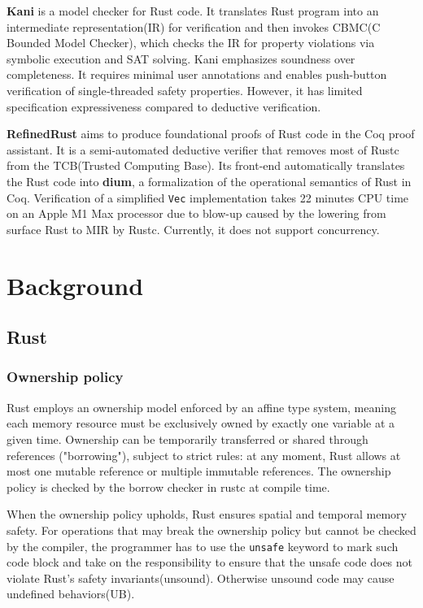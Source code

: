 \documentclass[conference]{IEEEtran}
\begin{document}
\textbf{Kani}\cite{kani} is a model checker for Rust code. It translates Rust program into an intermediate representation(IR) for verification and then invokes CBMC(C Bounded Model Checker)\cite{kroening2023cbmccboundedmodel}, which checks the IR for property violations via symbolic execution and SAT solving. Kani emphasizes soundness over completeness. It requires minimal user annotations and enables push-button verification of single‑threaded safety properties. However, it has limited specification expressiveness compared to deductive verification.   

\textbf{RefinedRust}\cite{RefinedRust} aims to produce foundational proofs of Rust code in the Coq proof assistant. It is a semi-automated deductive verifier that removes most of Rustc from the TCB(Trusted Computing Base). Its front-end automatically translates the Rust code into \textbf{dium}, a formalization of the operational semantics of Rust in Coq. Verification of a simplified \texttt{Vec} implementation takes 22 minutes CPU time on an Apple M1 Max processor due to blow-up caused by the lowering from surface Rust to MIR by Rustc. Currently, it does not support concurrency.    




\section{Background}

\subsection{Rust}
\subsubsection{Ownership policy}
Rust employs an ownership model enforced by an affine type system, meaning each memory resource must be exclusively owned by exactly one variable at a given time. Ownership can be temporarily transferred or shared through references ("borrowing"), subject to strict rules: at any moment, Rust allows at most one mutable reference or multiple immutable references. The ownership policy is checked by the borrow checker in rustc at compile time.

When the ownership policy upholds, Rust ensures spatial and temporal memory safety. For operations that may break the ownership policy but cannot be checked by the compiler, the programmer has to use the \texttt{unsafe} keyword to mark such code block and take on the responsibility to ensure that the unsafe code does not violate Rust's safety invariants(unsound). Otherwise unsound code may cause undefined behaviors(UB).
\end{document}
